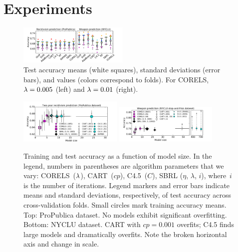 \section{Experiments}
\label{sec:experiments}

\begin{figure}[t!]
\begin{center}
\includegraphics[trim={8mm, 10mm, 15mm, 5mm},
width=0.47\textwidth]{figs/compare-compas-weapon.pdf}
\end{center}
\caption{Test accuracy means (white squares),
standard deviations (error bars),
and values (colors correspond to folds).
For CORELS, ${{\lambda} = 0.005}$ (left) and ${{\lambda} = 0.01}$ (right).
}
\label{fig:comparison}
\end{figure}

\begin{figure}[t!]
\begin{center}
\includegraphics[trim={12mm, 5mm, 24mm, 10mm}, width=0.44\textwidth]{figs/compas-sparsity-training.pdf}
\includegraphics[trim={15mm, 0mm, 24mm, 1mm}, width=0.44\textwidth]{figs/frisk-sparsity-training-c45.pdf}
\end{center}
\vspace{-5mm}
\caption{Training and test accuracy as a function of model size.
%
In the legend, numbers in parentheses are algorithm parameters that we vary:
CORELS~(${\lambda}$), CART~($cp$), C4.5~($C$), SBRL ($\eta$, $\lambda$, $i$),
where~$i$ is the number of iterations.
%
Legend markers and error bars indicate means and standard deviations,
respectively, of test accuracy across cross-validation folds.
%
Small circles mark training accuracy means.
%
Top: ProPublica dataset.
%
No models exhibit significant overfitting.
%
Bottom: NYCLU dataset.
%
CART with ${cp = 0.001}$ overfits;
C4.5 finds large models and dramatically overfits. %
%
Note the broken horizontal axis and change in scale.
}
\label{fig:sparsity}
\end{figure}

